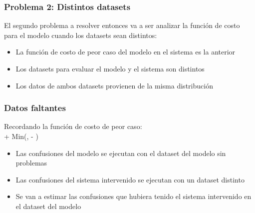 \begin{frame}
\frametitle{Problema 2: Distintos datasets}
El segundo problema a resolver entonces va a ser analizar la funci\'on de costo para el modelo cuando los datasets sean distintos: \\
\vspace{3mm}
\begin{itemize}
\item La funci\'on de costo de peor caso del modelo en el sistema es la anterior
\item Los datasets para evaluar el modelo y el sistema son distintos \item Los datos de ambos datasets provienen de la misma distribuci\'on
\end{itemize}
\end{frame}






\begin{frame}
\frametitle{Datos faltantes}
Recordando la funci\'on de costo de peor caso: \\
\vspace{3mm}
\IPFN + Min(\MFN, \IPTP - \INTP)
\vspace{3mm}
\begin{itemize}
    \item Las confusiones del modelo se ejecutan con el dataset del modelo sin problemas
    \item Las confusiones del sistema intervenido se ejecutan con un dataset distinto
    \item Se van a estimar las confusiones que hubiera tenido el sistema intervenido en el dataset del modelo
\end{itemize}
\end{frame}



